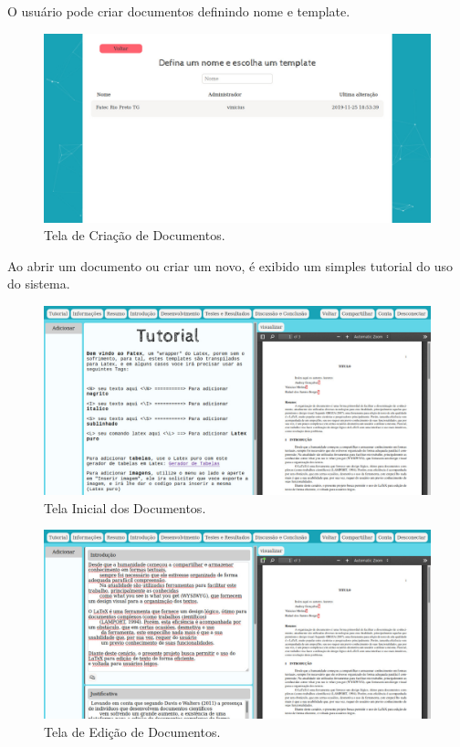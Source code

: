 \documentclass[article,12pt,oneside,a4paper,english,brazil,sumario=tradicional]{abntex2}
\begin{document}
O usuário pode criar documentos definindo nome e template.


  \begin{figure}[H]
    \centering
    \caption{Tela de Criação de Documentos.}
    \includegraphics[width=16cm]{figures/Tela Adicionar Projeto - FATEX.jpeg}
  \end{figure}


Ao abrir um documento ou criar um novo, é exibido um simples tutorial do uso do sistema.


  \begin{figure}[H]
    \centering
    \caption{Tela Inicial dos Documentos.}
    \includegraphics[width=16cm]{figures/Tela Inicial do Projeto - FATEX.jpeg}
  \end{figure}

  \begin{figure}[H]
    \centering
    \caption{Tela de Edição de Documentos.}
    \includegraphics[width=16cm]{figures/Tela Editar Projeto - FATEX.jpeg}
  \end{figure}
\end{document}
